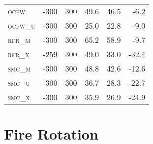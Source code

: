 \begin{table}[!htbp]
\begin{tabular}{@{}lrrrrr@{}}
\textsc{ocfw     }    & -300                 & 300                  & 49.6         & 46.5              &  -6.2      \\
\textsc{ocfw\_u  }    & -300                 & 300                  & 25.0         & 22.8              &  -9.0       \\
\textsc{rfr\_m   }    & -300                 & 300                  & 65.2         & 58.9              &  -9.7     \\
\textsc{rfr\_x   }    & -259                 & 300                  & 49.0         & 33.0              & -32.4     \\
\textsc{smc\_m   }    & -300                 & 300                  & 48.8         & 42.6              & -12.6      \\
\textsc{smc\_u   }    & -300                 & 300                  & 36.7         & 28.3              & -22.7     \\
\textsc{smc\_x   }    & -300                 & 300                  & 35.9         & 26.9              & -24.9     \\ \bottomrule
\end{tabular}
\end{table}



\section{Fire Rotation}

